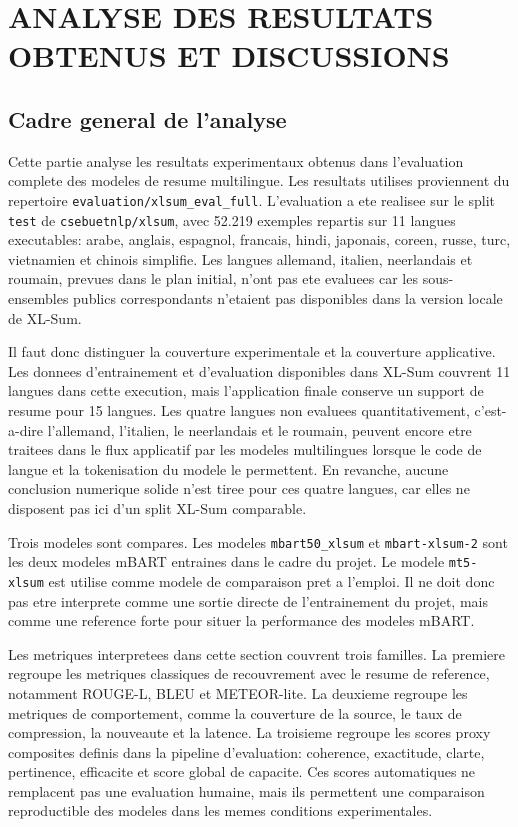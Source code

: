 \chapter{ANALYSE DES RESULTATS OBTENUS ET DISCUSSIONS}
\thispagestyle{empty}
\label{chap:analyse-resultats-discussions}

\section{Cadre general de l'analyse}

Cette partie analyse les resultats experimentaux obtenus dans l'evaluation complete des modeles de resume multilingue. Les resultats utilises proviennent du repertoire \texttt{evaluation/xlsum\_eval\_full}. L'evaluation a ete realisee sur le split \texttt{test} de \texttt{csebuetnlp/xlsum}, avec 52.219 exemples repartis sur 11 langues executables: arabe, anglais, espagnol, francais, hindi, japonais, coreen, russe, turc, vietnamien et chinois simplifie. Les langues allemand, italien, neerlandais et roumain, prevues dans le plan initial, n'ont pas ete evaluees car les sous-ensembles publics correspondants n'etaient pas disponibles dans la version locale de XL-Sum.

Il faut donc distinguer la couverture experimentale et la couverture applicative. Les donnees d'entrainement et d'evaluation disponibles dans XL-Sum couvrent 11 langues dans cette execution, mais l'application finale conserve un support de resume pour 15 langues. Les quatre langues non evaluees quantitativement, c'est-a-dire l'allemand, l'italien, le neerlandais et le roumain, peuvent encore etre traitees dans le flux applicatif par les modeles multilingues lorsque le code de langue et la tokenisation du modele le permettent. En revanche, aucune conclusion numerique solide n'est tiree pour ces quatre langues, car elles ne disposent pas ici d'un split XL-Sum comparable.

Trois modeles sont compares. Les modeles \texttt{mbart50\_\allowbreak xlsum} et \texttt{mbart-\allowbreak xlsum-2} sont les deux modeles mBART entraines dans le cadre du projet. Le modele \texttt{mt5-\allowbreak xlsum} est utilise comme modele de comparaison pret a l'emploi. Il ne doit donc pas etre interprete comme une sortie directe de l'entrainement du projet, mais comme une reference forte pour situer la performance des modeles mBART.

Les metriques interpretees dans cette section couvrent trois familles. La premiere regroupe les metriques classiques de recouvrement avec le resume de reference, notamment ROUGE-L, BLEU et METEOR-lite. La deuxieme regroupe les metriques de comportement, comme la couverture de la source, le taux de compression, la nouveaute et la latence. La troisieme regroupe les scores proxy composites definis dans la pipeline d'evaluation: coherence, exactitude, clarte, pertinence, efficacite et score global de capacite. Ces scores automatiques ne remplacent pas une evaluation humaine, mais ils permettent une comparaison reproductible des modeles dans les memes conditions experimentales.

